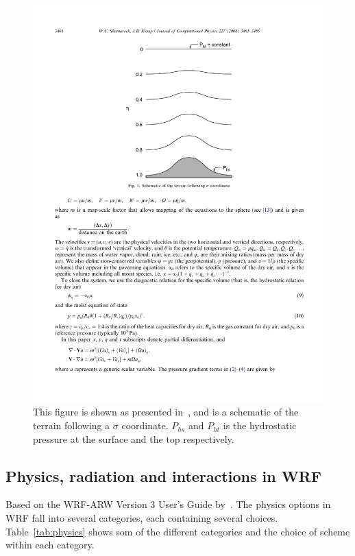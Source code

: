 \begin{figure}
\centering
\includegraphics[scale=0.9]{model_methods/sigma.pdf}
\caption{This figure is shown as presented in~\citet{Skamarock2008}, and is a schematic of the terrain following a $\sigma$ coordinate. $P_{hs}$ and $P_{ht}$ is the hydrostatic pressure at the surface and the top respectively.}
\label{fig:sigma}
\end{figure}

\subsection{Physics, radiation and interactions in WRF}
Based on the WRF-ARW Version 3 User's Guide by~\citet{Wang2015}.
The physics options in WRF fall into several categories, each containing several choices. Table~\ref{tab:physics} shows som of the different categories and the choice of scheme within each category.

